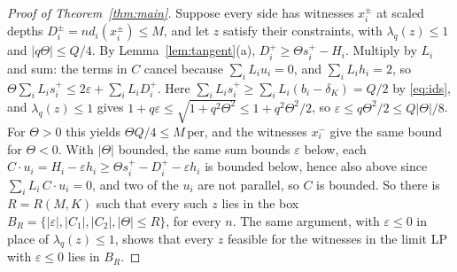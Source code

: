 \documentclass[11pt]{amsart}
\theoremstyle{remark}\newtheorem{remark}[theorem]{Remark}
\begin{document}
\begin{proof}[Proof of Theorem~\ref{thm:main}]
Suppose every side has witnesses $x_i^\pm$ at scaled depths $D_i^\pm=nd_i(x_i^\pm)\le M$, and let $z$ satisfy their
constraints, with $\lambda_q(z)\le1$ and $|q\Theta|\le Q/4$. By Lemma~\ref{lem:tangent}(a), $D_i^+\ge\Theta s_i^+-H_i$.
Multiply by $L_i$ and sum: the terms in $C$ cancel because $\sum_iL_iu_i=0$, and $\sum_iL_ih_i=2$, so
$\Theta\sum_iL_is_i^+\le2\varepsilon+\sum_iL_iD_i^+$. Here $\sum_iL_is_i^+\ge\sum_iL_i(b_i-\delta_K)=Q/2$ by
\eqref{eq:ids}, and $\lambda_q(z)\le1$ gives $1+q\varepsilon\le\sqrt{1+q^2\Theta^2}\le1+q^2\Theta^2/2$, so
$\varepsilon\le q\Theta^2/2\le Q|\Theta|/8$. For $\Theta>0$ this yields $\Theta Q/4\le M\,\mathrm{per}$, and the
witnesses $x_i^-$ give the same bound for $\Theta<0$. With $|\Theta|$ bounded, the same sum bounds $\varepsilon$ below,
each $C\cdot u_i=H_i-\varepsilon h_i\ge\Theta s_i^+-D_i^+-\varepsilon h_i$ is bounded below, hence also above since
$\sum_iL_i\,C\cdot u_i=0$, and two of the $u_i$ are not parallel, so $C$ is bounded. So there is $R=R(M,K)$ such that
every such $z$ lies in the box $B_R=\{|\varepsilon|,|C_1|,|C_2|,|\Theta|\le R\}$, for every $n$. The same argument,
with $\varepsilon\le0$ in place of $\lambda_q(z)\le1$, shows that every $z$ feasible for the witnesses in the limit LP
with $\varepsilon\le0$ lies in $B_R$.


\end{proof}
\end{document}
